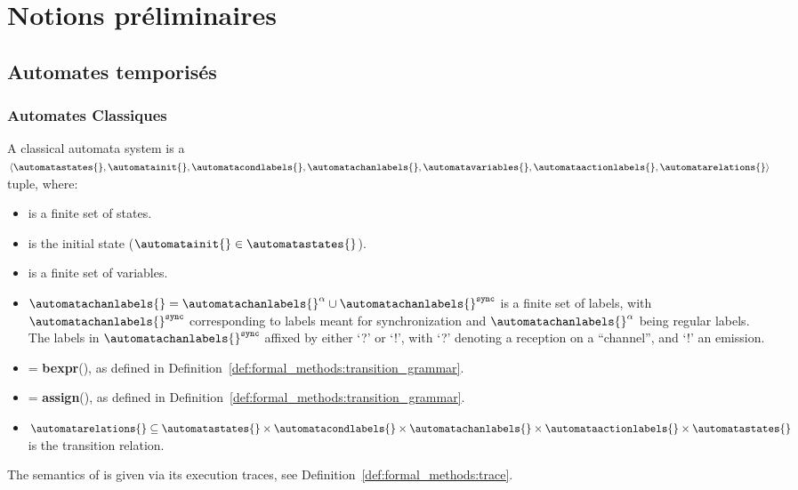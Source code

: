 \section{Notions pr\'eliminaires}

\subsection{Automates temporis\'es}
\subsubsection{Automates Classiques}

\begin{definition}
A classical automata system \automatasystem{} is a
$\langle \automatastates{}, \allowbreak{}
\automatainit{}, \allowbreak{}
\automatacondlabels{}, \allowbreak{}
\automatachanlabels{}, \allowbreak{}
\automatavariables{}, \allowbreak{}
\automataactionlabels{}, \allowbreak{}
\automatarelations{}\rangle$ tuple, where:
\begin{itemize}
\item \automatastates{} is a finite set of states.
\item \automatainit{} is the initial state ($\automatainit{} \in
\automatastates{}$).
\item \automatavariables{} is a finite set of variables.
\item
   $\automatachanlabels{} = \automatachanlabels{}^{\alpha} \cup
   \automatachanlabels{}^{\texttt{sync}}$ is a finite set of labels, with
   $\automatachanlabels{}^{\texttt{sync}}$ corresponding to labels meant for
   synchronization and $\automatachanlabels{}^{\alpha}$ being regular labels.
   The labels in $\automatachanlabels{}^{\texttt{sync}}$ affixed by either `?'
   or `!', with `?' denoting a reception on a ``channel'', and `!' an emission.
\item
   \automatacondlabels{} = \textbf{bexpr}(\automatavariables{}), as defined in
   Definition~\ref{def:formal_methods:transition_grammar}.
\item
   \automataactionlabels{} = \textbf{assign}(\automatavariables{}), as defined
   in Definition~\ref{def:formal_methods:transition_grammar}.
\item
   $\automatarelations{} \subseteq
      \automatastates{}
      \times \automatacondlabels{}
      \times \automatachanlabels{}
      \times \automataactionlabels{}
      \times \automatastates{}
   $ is the transition relation.
\end{itemize}
The semantics of \automatasystem{} is given via its execution traces, see
Definition~\ref{def:formal_methods:trace}.
\end{definition}

